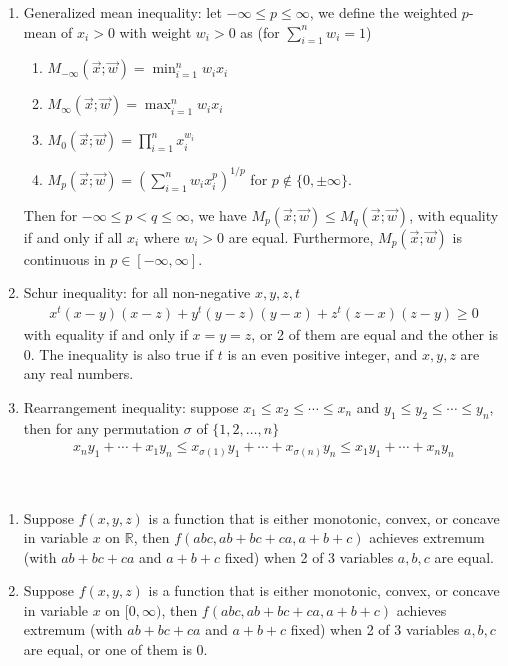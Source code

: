 \documentclass{treatise}
\begin{document}
\begin{shaded}
\begin{theorem}[Inequalities]
\begin{enumerate}
	\item Generalized mean inequality: let $-\infty \leq p \leq \infty$, we define the weighted $p$-mean of $x_i > 0$ with weight $w_i > 0$ as (for $\sum_{i = 1}^n w_i = 1$)
	\begin{enumerate}
		\item $M_{-\infty} (\vec{x}; \vec{w}) = \min_{i = 1}^n w_i x_i$
		\item $M_{\infty} (\vec{x}; \vec{w}) = \max_{i = 1}^n w_i x_i$
		\item $M_0 (\vec{x}; \vec{w}) = \prod_{i = 1}^n x_i^{w_i}$
		\item $M_p (\vec{x}; \vec{w}) = \left( \sum_{i = 1}^n w_i x_i^p \right)^{1/p}$ for $p \notin \{ 0, \pm \infty \}$.
	\end{enumerate}
	Then for $-\infty \leq p < q \leq \infty$, we have $M_p (\vec{x}; \vec{w}) \leq M_q (\vec{x}; \vec{w})$, with equality if and only if all $x_i$ where $w_i > 0$ are equal. Furthermore, $M_p (\vec{x}; \vec{w})$ is continuous in $p \in [-\infty, \infty]$. 
	\item Schur inequality: for all non-negative $x, y, z, t$
	\begin{align*}
		x^t (x - y)(x - z) + y^t (y - z)(y - x) + z^t (z - x)(z - y) \geq 0
	\end{align*}
	with equality if and only if $x = y = z$, or 2 of them are equal and the other is $0$. The inequality is also true if $t$ is an even positive integer, and $x, y, z$ are any real numbers.
	\item Rearrangement inequality: suppose $x_1 \leq x_2 \leq \cdots \leq x_n$ and $y_1 \leq y_2 \leq \cdots \leq y_n$, then for any permutation $\sigma$ of $\{ 1, 2, \hdots, n \}$
	\begin{align*}
	x_n y_1 + \cdots + x_1 y_n \leq x_{\sigma(1)} y_1 + \cdots + x_{\sigma(n)} y_n \leq x_1 y_1 + \cdots + x_n y_n
	\end{align*}
\end{enumerate}
\end{theorem}
\begin{theorem} \ 
\begin{enumerate}
	\item Suppose $f(x, y, z)$ is a function that is either monotonic, convex, or concave in variable $x$ on $\mathbb{R}$, then $f(abc, ab + bc + ca, a + b + c)$ achieves extremum (with $ab + bc + ca$ and $a + b + c$ fixed) when 2 of 3 variables $a, b, c$ are equal.
	\item Suppose $f(x, y, z)$ is a function that is either monotonic, convex, or concave in variable $x$ on $[0, \infty)$, then $f(abc, ab + bc + ca, a + b + c)$ achieves extremum (with $ab + bc + ca$ and $a + b + c$ fixed) when 2 of 3 variables $a, b, c$ are equal, or one of them is $0$.
\end{enumerate}
\end{theorem}


\end{shaded}
\end{document}
